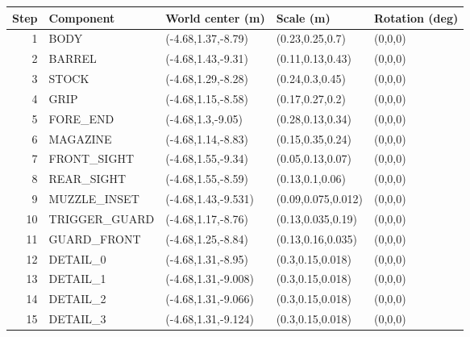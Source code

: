 \begin{center}\scriptsize\begin{tabular}{rllll}\toprule
Step & Component & World center (m) & Scale (m) & Rotation (deg) \\\midrule
1 & BODY & (-4.68,1.37,-8.79) & (0.23,0.25,0.7) & (0,0,0) \\
2 & BARREL & (-4.68,1.43,-9.31) & (0.11,0.13,0.43) & (0,0,0) \\
3 & STOCK & (-4.68,1.29,-8.28) & (0.24,0.3,0.45) & (0,0,0) \\
4 & GRIP & (-4.68,1.15,-8.58) & (0.17,0.27,0.2) & (0,0,0) \\
5 & FORE\_END & (-4.68,1.3,-9.05) & (0.28,0.13,0.34) & (0,0,0) \\
6 & MAGAZINE & (-4.68,1.14,-8.83) & (0.15,0.35,0.24) & (0,0,0) \\
7 & FRONT\_SIGHT & (-4.68,1.55,-9.34) & (0.05,0.13,0.07) & (0,0,0) \\
8 & REAR\_SIGHT & (-4.68,1.55,-8.59) & (0.13,0.1,0.06) & (0,0,0) \\
9 & MUZZLE\_INSET & (-4.68,1.43,-9.531) & (0.09,0.075,0.012) & (0,0,0) \\
10 & TRIGGER\_GUARD & (-4.68,1.17,-8.76) & (0.13,0.035,0.19) & (0,0,0) \\
11 & GUARD\_FRONT & (-4.68,1.25,-8.84) & (0.13,0.16,0.035) & (0,0,0) \\
12 & DETAIL\_0 & (-4.68,1.31,-8.95) & (0.3,0.15,0.018) & (0,0,0) \\
13 & DETAIL\_1 & (-4.68,1.31,-9.008) & (0.3,0.15,0.018) & (0,0,0) \\
14 & DETAIL\_2 & (-4.68,1.31,-9.066) & (0.3,0.15,0.018) & (0,0,0) \\
15 & DETAIL\_3 & (-4.68,1.31,-9.124) & (0.3,0.15,0.018) & (0,0,0) \\
\bottomrule\end{tabular}\end{center}
